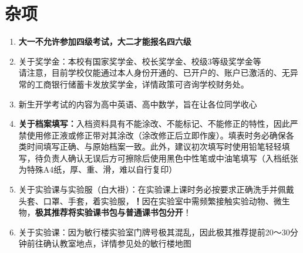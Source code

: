 \section[杂项]{杂项}
\begin{enumerate}
    \item \textbf{大一不允许参加四级考试，大二才能报名四六级}
    \item 关于奖学金：本校有国家奖学金、校长奖学金、校级3等级奖学金等\\
          请注意，目前学校仅能通过本人身份开通的、已开户的、账户已激活的、无异常的工商银行储蓄卡发放奖学金，详情政策可咨询学校财务处。
    \item 新生开学考试\footnotemark 的内容为高中英语、高中数学，旨在让各位同学收心
    \item \textbf{关于档案填写：}入档资料具有不能涂改、不能标记、不能修正的特性，因此严禁使用修正液或修正带对其涂改（涂改修正后立即作废）。填表时务必确保各类时间填写正确、与原始档案一致。此外，建议初次填写时使用铅笔轻轻填写，待负责人确认无误后方可擦除后使用黑色中性笔或中油笔填写（入档纸张为特殊A4纸，厚、重、滑，难以自行复印）
    \item 关于实验课与实验服（白大褂）：在实验课上课时务必按要求正确洗手并佩戴头套、口罩、手套，着实验服，\textbf{！}因在实验室中需频繁接触实验动物、微生物，\textbf{极其推荐将实验课书包与普通课书包分开}！\label{schoolbag}
    \item 关于实验课：因为敏行楼实验室门牌号极其混乱，因此极其推荐提前20～30分钟前往确认教室地点，详情参见处的敏行楼地图
\end{enumerate}
